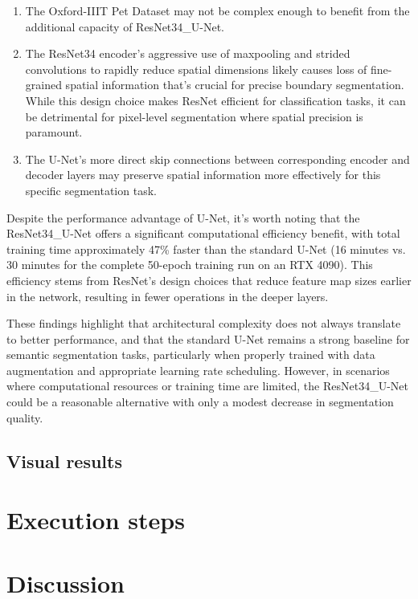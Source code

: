 \documentclass[twocolumn,a4paper]{article}
\begin{document}
\begin{enumerate}
\item The Oxford-IIIT Pet Dataset may not be complex enough to benefit from the additional capacity of ResNet34\_U-Net.
\item The ResNet34 encoder's aggressive use of maxpooling and strided convolutions to rapidly reduce spatial dimensions likely causes loss of fine-grained spatial information that's crucial for precise boundary segmentation. While this design choice makes ResNet efficient for classification tasks, it can be detrimental for pixel-level segmentation where spatial precision is paramount.
\item The U-Net's more direct skip connections between corresponding encoder and decoder layers may preserve spatial information more effectively for this specific segmentation task.
\end{enumerate}

Despite the performance advantage of U-Net, it's worth noting that the ResNet34\_U-Net offers a significant computational efficiency benefit, with total training time approximately 47\% faster than the standard U-Net (16 minutes vs. 30 minutes for the complete 50-epoch training run on an RTX 4090). This efficiency stems from ResNet's design choices that reduce feature map sizes earlier in the network, resulting in fewer operations in the deeper layers.

These findings highlight that architectural complexity does not always translate to better performance, and that the standard U-Net remains a strong baseline for semantic segmentation tasks, particularly when properly trained with data augmentation and appropriate learning rate scheduling. However, in scenarios where computational resources or training time are limited, the ResNet34\_U-Net could be a reasonable alternative with only a modest decrease in segmentation quality.

\subsection{Visual results}

\section{Execution steps}
\section{Discussion} \label{sec:discussion}
\end{document}
